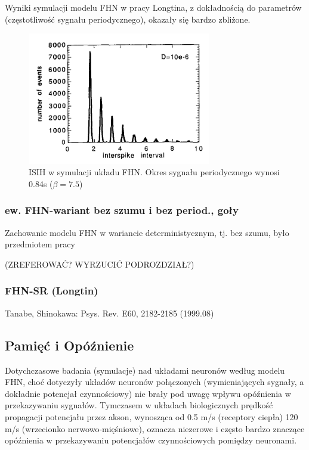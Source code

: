   Wyniki symulacji modelu FHN w pracy Longtina, z dokładnością do parametrów (częstotliwość sygnału periodycznego), okazały się bardzo zbliżone.

  \begin{figure}
    \includegraphics[width=80mm]{images/longtin_fig5a.png}
    \caption{ISIH w symulacji układu FHN. Okres sygnału periodycznego wynosi 0.84s ($\beta = 7.5$)}
  \end{figure}  



  \subsubsection{ew. FHN-wariant bez szumu i bez period., goły}

  Zachowanie modelu FHN w wariancie deterministycznym, tj. bez szumu, było przedmiotem pracy \cite{alexander}

  (ZREFEROWAĆ? WYRZUCIĆ PODROZDZIAŁ?)

  \subsubsection{FHN-SR (Longtin)}


  Tanabe, Shinokawa: Psys. Rev. E60, 2182-2185 (1999.08)
  
  \subsection{Pamięć i Opóźnienie}
  
  Dotychczasowe badania (symulacje) nad układami neuronów według modelu FHN, choć dotyczyły układów neuronów połączonych (wymieniających sygnały, a dokładnie potencjał czynnościowy) nie brały pod uwagę wpływu opóźnienia w przekazywaniu sygnałów. Tymczasem w układach biologicznych prędkość propagacji potencjału przez akson, wynosząca od 0.5 m/s (receptory ciepła) 120 m/s (wrzecionko nerwowo-mięśniowe), oznacza niezerowe i często bardzo znaczące opóźnienia w przekazywaniu potencjałów czynnościowych pomiędzy neuronami.

